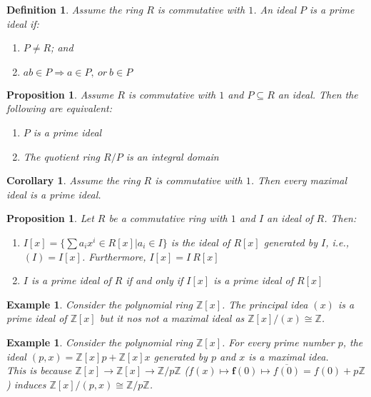 \documentclass[a4paper,8pt]{article}
\newcommand{\f}{\mathbf{f}}
\theoremstyle{theorem}
\newtheorem{corollary}[theorem]{Corollary}
\newtheorem{proposition}[theorem]{Proposition}
\newtheorem{definition}[theorem]{Definition}
\newtheorem{example}[theorem]{Example}
\begin{document}
\begin{definition}
Assume the ring $R$ is commutative with $1$. An ideal $P$ is a prime ideal if:
\begin{enumerate}[label=(\roman*)]
\item $P \neq R$; and
\item $ab \in P \Rightarrow a \in P, \ or \ b \in P$
\end{enumerate}
\end{definition}


\begin{proposition}
Assume $R$ is commutative with $1$ and $P \subseteq R$ an ideal. Then the following are equivalent:
\begin{enumerate}[label=(\roman*)]
\item $P$ is a prime ideal
\item The quotient ring $R/P$ is an integral domain
\end{enumerate}
\end{proposition}


\begin{corollary}
Assume the ring $R$ is commutative with $1$. Then every maximal ideal is a prime ideal.	
\end{corollary}


\begin{proposition}
Let $R$ be a commutative ring with $1$ and $I$ an ideal of $R$. Then:
\begin{enumerate}[label=(\roman*)]
\item $I[x] = \{\sum a_i x^i \in R[x] | a_i \in I \}$ is the ideal of $R[x]$ generated by $I$, i.e., $(I) = I[x]$. Furthermore, $I[x] = I \ R[x]$
\item $I$ is a prime ideal of $R$ if and only if $I[x]$ is a prime ideal of $R[x]$
\end{enumerate}
\end{proposition}


\begin{example}
Consider the polynomial ring $\mathbb{Z}[x]$.
The principal idea $(x)$ is a prime ideal of $\mathbb{Z}[x]$ but it nos not a maximal ideal as $\mathbb{Z}[x]/(x) \cong \mathbb{Z}$.
\end{example}


\begin{example}
Consider the polynomial ring $\mathbb{Z}[x]$.
For every prime number $p$, the ideal $(p,x)=\mathbb{Z}[x]p + \mathbb{Z}[x]x$ generated by $p$ and $x$ is a maximal idea.\\
This is because $\mathbb{Z}[x] \rightarrow \mathbb{Z}[x] \rightarrow \mathbb{Z}/p\mathbb{Z}$ ($f(x) \mapsto \f(0) \mapsto \overline{f(0)} = f(0) + p\mathbb{Z}$) induces $\mathbb{Z}[x]/(p,x) \cong \mathbb{Z}/p\mathbb{Z}$.
\end{example}
\end{document}
